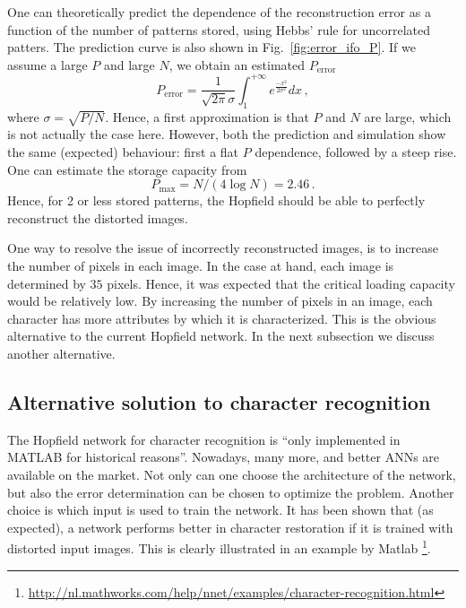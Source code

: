 \documentclass[pdftex,11pt,a4paper]{article}
\begin{document}
One can theoretically predict the dependence of the reconstruction error as a function of the number of patterns stored, using Hebbs' rule for uncorrelated patters. The prediction curve is also shown in Fig.~\ref{fig:error_ifo_P}. If we assume a large $P$ and large $N$, we obtain an estimated $P_{\textrm{error}}$
\begin{equation}
P_{\textrm{error}} = \frac{1}{\sqrt{2 \pi} \sigma} \int_{1}^{+\infty} e^{\frac{-x^2}{2 \sigma^2}} dx \,,
\end{equation}
where $\sigma=\sqrt{P/N}$. Hence, a first approximation is that $P$ and $N$ are large, which is not actually the case here. However, both the prediction and simulation show the same (expected) behaviour: first a flat $P$ dependence, followed by a steep rise. One can estimate the storage capacity from
\begin{equation}
P_{\max} = N/(4 \log N) =2.46 \,.
\end{equation}
Hence, for 2 or less stored patterns, the Hopfield should be able to perfectly reconstruct the distorted images.

One way to resolve the issue of incorrectly reconstructed images, is to increase the number of pixels in each  image. In the case at hand, each image is determined by $35$ pixels. Hence, it was expected that the critical loading capacity would be relatively low. By increasing the number of pixels in an image, each character has more attributes by which it is characterized. This is the obvious alternative to the current Hopfield network. In the next subsection we discuss another alternative.

\subsection{Alternative solution to character recognition}
The Hopfield network for character recognition is ``only implemented in MATLAB for historical reasons''. Nowadays, many more, and better ANNs are available on the market. Not only can one choose the architecture of the network, but also the error determination can be chosen to optimize the problem. Another choice is which input is used to train the network. It has been shown that (as expected), a network performs better in character restoration if it is trained with distorted input images. This is clearly illustrated in an example by Matlab \footnote{\url{http://nl.mathworks.com/help/nnet/examples/character-recognition.html}}.
\end{document}
